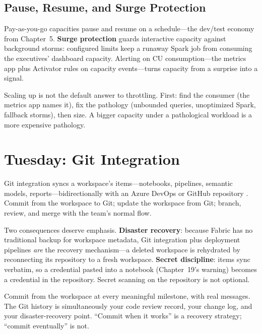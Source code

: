\subsection{Pause, Resume, and Surge Protection}
Pay-as-you-go capacities pause and resume on a schedule---the dev/test economy from Chapter~5. \textbf{Surge protection} guards interactive capacity against background storms: configured limits keep a runaway Spark job from consuming the executives' dashboard capacity. Alerting on CU consumption---the metrics app plus Activator rules on capacity events---turns capacity from a surprise into a signal.

\begin{pitfall}
Scaling up is not the default answer to throttling. First: find the consumer (the metrics app names it), fix the pathology (unbounded queries, unoptimized Spark, fallback storms), then size. A bigger capacity under a pathological workload is a more expensive pathology.
\end{pitfall}

\section{Tuesday: Git Integration}
Git integration syncs a workspace's items---notebooks, pipelines, semantic models, reports---bidirectionally with an Azure DevOps or GitHub repository \cite{microsoftFabricGitIntegration}. Commit from the workspace to Git; update the workspace from Git; branch, review, and merge with the team's normal flow.

Two consequences deserve emphasis. \textbf{Disaster recovery}: because Fabric has no traditional backup for workspace metadata, Git integration plus deployment pipelines \emph{are} the recovery mechanism---a deleted workspace is rehydrated by reconnecting its repository to a fresh workspace. \textbf{Secret discipline}: items sync verbatim, so a credential pasted into a notebook (Chapter~19's warning) becomes a credential in the repository. Secret scanning on the repository is not optional.

\begin{tipbox}
Commit from the workspace at every meaningful milestone, with real messages. The Git history is simultaneously your code review record, your change log, and your disaster-recovery point. ``Commit when it works'' is a recovery strategy; ``commit eventually'' is not.
\end{tipbox}

